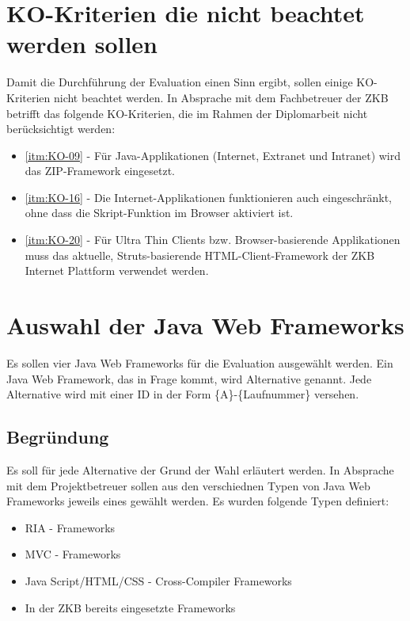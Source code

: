   \section{KO-Kriterien die nicht beachtet werden sollen}
  
  Damit die Durchführung der Evaluation einen Sinn ergibt, sollen einige
  KO-Kriterien nicht beachtet werden. In Absprache mit dem Fachbetreuer der
  \ac{ZKB} betrifft das folgende KO-Kriterien, die im Rahmen der Diplomarbeit
  nicht berücksichtigt werden:
  
  \begin{itemize}
    \item \ref{itm:KO-09} - Für Java-Applikationen (Internet, Extranet und
    Intranet) wird das ZIP-Framework eingesetzt.
    \item \ref{itm:KO-16} - Die Internet-Applikationen funktionieren auch
    eingeschränkt, ohne dass die Skript-Funktion im Browser aktiviert ist.
    \item \ref{itm:KO-20} - Für Ultra Thin Clients bzw. Browser-basierende
    Applikationen muss das aktuelle, Struts-basierende HTML-Client-Framework
    der ZKB Internet Plattform verwendet werden.
  \end{itemize}
  
  \section{Auswahl der Java Web Frameworks}
  
  Es sollen vier Java Web Frameworks für die Evaluation ausgewählt werden. Ein
  Java Web Framework, das in Frage kommt, wird Alternative genannt. Jede
  Alternative wird mit einer ID in der Form \{A\}-\{Laufnummer\} versehen.
  
  \subsection{Begründung}
  
  Es soll für jede Alternative der Grund der Wahl erläutert werden. In Absprache
  mit dem Projektbetreuer sollen aus den verschiednen Typen von Java Web
  Frameworks jeweils eines gewählt werden. Es wurden folgende Typen definiert:
  
  \begin{itemize}
    \item \ac{RIA} - Frameworks
    \item MVC - Frameworks
    \item Java Script/HTML/CSS - Cross-Compiler Frameworks
    \item In der \ac{ZKB} bereits eingesetzte Frameworks
  \end{itemize}
  
